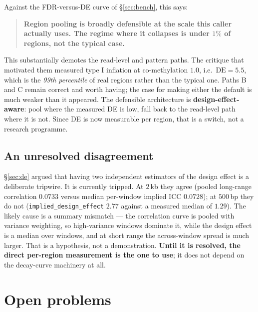 \documentclass[11pt]{article}
\begin{document}
Against the FDR-versus-DE curve of \S\ref{sec:bench}, this says:

\begin{quote}
\textbf{Region pooling is broadly defensible at the scale this caller actually
uses. The regime where it collapses is under $1\%$ of regions, not the typical
case.}
\end{quote}

This substantially demotes the read-level and pattern paths. The critique that
motivated them measured type I inflation at co-methylation $1.0$, i.e.\
$\mathrm{DE} = 5.5$, which is the \emph{99th percentile} of real regions rather
than the typical one. Paths B and C remain correct and worth having; the case for
making either the default is much weaker than it appeared. The defensible
architecture is \textbf{design-effect-aware}: pool where the measured DE is low,
fall back to the read-level path where it is not. Since DE is now measurable per
region, that is a switch, not a research programme.

\subsection{An unresolved disagreement}

\S\ref{sec:de} argued that having two independent estimators of the design effect
is a deliberate tripwire. It is currently tripped. At $2$\,kb they agree
(pooled long-range correlation $0.0733$ versus median per-window implied ICC
$0.0728$); at $500$\,bp they do not (\texttt{implied\_design\_effect} $2.77$
against a measured median of $1.29$). The likely cause is a summary mismatch ---
the correlation curve is pooled with variance weighting, so high-variance windows
dominate it, while the design effect is a median over windows, and at short range
the across-window spread is much larger. That is a hypothesis, not a
demonstration. \textbf{Until it is resolved, the direct per-region measurement is
the one to use}; it does not depend on the decay-curve machinery at all.

\section{Open problems}
\end{document}

